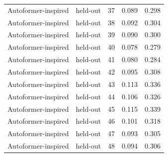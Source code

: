 \begin{tabular}{llrrr}
Autoformer-inspired & held-out & 37 & 0.089 & 0.298 \\
Autoformer-inspired & held-out & 38 & 0.092 & 0.304 \\
Autoformer-inspired & held-out & 39 & 0.090 & 0.300 \\
Autoformer-inspired & held-out & 40 & 0.078 & 0.279 \\
Autoformer-inspired & held-out & 41 & 0.080 & 0.284 \\
Autoformer-inspired & held-out & 42 & 0.095 & 0.308 \\
Autoformer-inspired & held-out & 43 & 0.113 & 0.336 \\
Autoformer-inspired & held-out & 44 & 0.106 & 0.326 \\
Autoformer-inspired & held-out & 45 & 0.115 & 0.339 \\
Autoformer-inspired & held-out & 46 & 0.101 & 0.318 \\
Autoformer-inspired & held-out & 47 & 0.093 & 0.305 \\
Autoformer-inspired & held-out & 48 & 0.094 & 0.306 \\
\bottomrule
\end{tabular}
